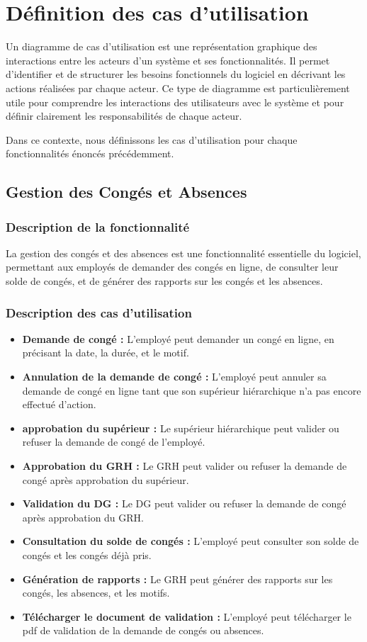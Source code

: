 \section{D\'efinition des cas d'utilisation}

Un diagramme de cas d'utilisation est une représentation graphique des interactions entre les acteurs d'un système et ses fonctionnalités. Il permet d'identifier et de structurer les besoins fonctionnels du logiciel en décrivant les actions réalisées par chaque acteur. Ce type de diagramme est particulièrement utile pour comprendre les interactions des utilisateurs avec le système et pour définir clairement les responsabilités de chaque acteur.

Dans ce contexte, nous définissons les cas d'utilisation pour chaque fonctionnalités énoncés précédemment.
\subsection{Gestion des Congés et Absences}
\subsubsection{Description de la fonctionnalité}
La gestion des congés et des absences est une fonctionnalité essentielle du logiciel, permettant aux employés de demander des congés en ligne, de consulter leur solde de congés, et de générer des rapports sur les congés et les absences.
\subsubsection{Description des cas d'utilisation}
\begin{itemize}
    \item \textbf{Demande de congé :} L'employé peut demander un congé en ligne, en précisant la date, la durée, et le motif.
    \item \textbf{Annulation de la demande de congé :} L'employé peut annuler sa demande de congé en ligne tant que son supérieur hiérarchique n'a pas encore effectué d'action.
    \item \textbf{approbation du supérieur :} Le supérieur hiérarchique peut valider ou refuser la demande de congé de l'employé.
    \item \textbf{Approbation du GRH :} Le GRH peut valider ou refuser la demande de congé après approbation du supérieur.
    \item \textbf{Validation du DG :} Le DG peut valider ou refuser la demande de congé après approbation du GRH.
    \item \textbf{Consultation du solde de congés :} L'employé peut consulter son solde de congés et les congés déjà pris.
    \item \textbf{Génération de rapports :} Le GRH peut générer des rapports sur les congés, les absences, et les motifs.
    \item \textbf{Télécharger le document de validation :} L'employé peut télécharger le pdf de validation de la demande de congés ou absences.
\end{itemize}
